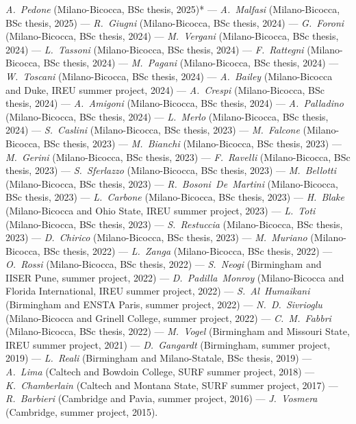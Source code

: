 \textit{\textit{A.~Pedone}} (Milano-Bicocca, BSc thesis, 2025)* --- 
\textit{\textit{A.~Malfasi}} (Milano-Bicocca, BSc thesis, 2025) --- 
\textit{\textit{R.~Giugni}} (Milano-Bicocca, BSc thesis, 2024) --- 
\textit{\textit{G.~Foroni}} (Milano-Bicocca, BSc thesis, 2024) --- 
\textit{\textit{M.~Vergani}} (Milano-Bicocca, BSc thesis, 2024) --- 
\textit{\textit{L.~Tassoni}} (Milano-Bicocca, BSc thesis, 2024) --- 
\textit{\textit{F.~Rattegni}} (Milano-Bicocca, BSc thesis, 2024) --- 
\textit{\textit{M.~Pagani}} (Milano-Bicocca, BSc thesis, 2024) --- 
\textit{\textit{W.~Toscani}} (Milano-Bicocca, BSc thesis, 2024) --- 
\textit{\textit{A.~Bailey}} (Milano-Bicocca and Duke, IREU summer project, 2024) --- 
\textit{\textit{A.~Crespi}} (Milano-Bicocca, BSc thesis, 2024) --- 
\textit{\textit{A.~Amigoni}} (Milano-Bicocca, BSc thesis, 2024) --- 
\textit{\textit{A.~Palladino}} (Milano-Bicocca, BSc thesis, 2024) --- 
\textit{\textit{L.~Merlo}} (Milano-Bicocca, BSc thesis, 2024) --- 
\textit{\textit{S.~Caslini}} (Milano-Bicocca, BSc thesis, 2023) --- 
\textit{\textit{M.~Falcone}} (Milano-Bicocca, BSc thesis, 2023) --- 
\textit{\textit{M.~Bianchi}} (Milano-Bicocca, BSc thesis, 2023) --- 
\textit{\textit{M.~Gerini}} (Milano-Bicocca, BSc thesis, 2023) --- 
\textit{\textit{F.~Ravelli}} (Milano-Bicocca, BSc thesis, 2023) --- 
\textit{\textit{S.~Sferlazzo}} (Milano-Bicocca, BSc thesis, 2023) --- 
\textit{\textit{M.~Bellotti}} (Milano-Bicocca, BSc thesis, 2023) --- 
\textit{\textit{R.~Bosoni~De~Martini}} (Milano-Bicocca, BSc thesis, 2023) --- 
\textit{\textit{L.~Carbone}} (Milano-Bicocca, BSc thesis, 2023) --- 
\textit{\textit{H.~Blake}} (Milano-Bicocca and Ohio State, IREU summer project, 2023) --- 
\textit{\textit{L.~Toti}} (Milano-Bicocca, BSc thesis, 2023) --- 
\textit{\textit{S.~Restuccia}} (Milano-Bicocca, BSc thesis, 2023) --- 
\textit{\textit{D.~Chirico}} (Milano-Bicocca, BSc thesis, 2023) --- 
\textit{\textit{M.~Muriano}} (Milano-Bicocca, BSc thesis, 2022) --- 
\textit{\textit{L.~Zanga}} (Milano-Bicocca, BSc thesis, 2022) --- 
\textit{\textit{O.~Rossi}} (Milano-Bicocca, BSc thesis, 2022) --- 
\textit{\textit{S.~Neogi}} (Birmingham and IISER Pune, summer project, 2022) --- 
\textit{\textit{D.~Padilla~Monroy}} (Milano-Bicocca and Florida International, IREU summer project, 2022) --- 
\textit{\textit{S.~Al~Humaikani}} (Birmingham and ENSTA Paris, summer project, 2022) --- 
\textit{\textit{N.~D.~Sivrioglu}} (Milano-Bicocca and Grinell College, summer project, 2022) --- 
\textit{\textit{C.~M.~Fabbri}} (Milano-Bicocca, BSc thesis, 2022) --- 
\textit{\textit{M.~Vogel}} (Birmingham and Missouri State, IREU summer project, 2021) --- 
\textit{\textit{D.~Gangardt}} (Birmingham, summer project, 2019) --- 
\textit{\textit{L.~Reali}} (Birmingham and Milano-Statale, BSc thesis, 2019) --- 
\textit{\textit{A.~Lima}} (Caltech and Bowdoin College, SURF summer project, 2018) --- 
\textit{\textit{K.~Chamberlain}} (Caltech and Montana State, SURF summer project, 2017) --- 
\textit{\textit{R.~Barbieri}} (Cambridge and Pavia, summer project, 2016) --- 
\textit{\textit{J.~Vosmera}} (Cambridge, summer project, 2015).
